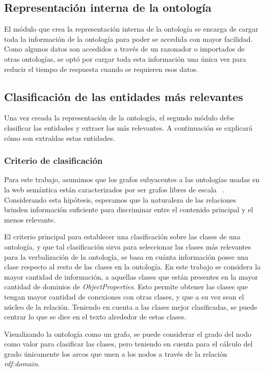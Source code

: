 \subsection{Representación interna de la ontología}

El módulo que crea la representación interna de la ontología se encarga de cargar toda la información de la ontología para poder se accedida con mayor facilidad. Como algunos datos son accedidos a través de un razonador o importados de otras ontologías, se optó por cargar toda esta información una única vez para reducir el tiempo de respuesta cuando se requieren esos datos.

\subsection{Clasificación de las entidades más relevantes}
Una vez creada la representación de la ontología, el segundo módulo debe clasificar las entidades y extraer las más relevantes. A continuación se explicará cómo son extraídas estas entidades.

\subsubsection{Criterio de clasificación}
Para este trabajo, asumimos que los grafos subyacentes a las ontologías usadas en la web semántica están caracterizados por ser grafos libres de escala ~\cite{zhang2008scale}. Considerando esta hipótesis, esperamos que la naturaleza de las relaciones brinden información suficiente para discriminar entre el contenido principal y el menos relevante.

El criterio principal para establecer una clasificación sobre las clases de una ontología, y que tal clasificación sirva para seleccionar las clases más relevantes para la verbalización de la ontología, se basa en cuánta información posee una clase respecto al resto de las clases en la ontología. En este trabajo se considera la mayor cantidad de información, a aquellas clases que están presentes en la mayor cantidad de dominios de \emph{ObjectProperties}. Esto permite obtener las clases que tengan mayor cantidad de conexiones con otras clases, y que a su vez sean el núcleo de la relación. Teniendo en cuenta a las clases mejor clasificadas, se puede centrar lo que se dice en el texto alrededor de estas clases.

Visualizando la ontología como un grafo, se puede considerar el grado del nodo como valor para clasificar las clases, pero teniendo en cuenta para el cálculo del grado únicamente los arcos que  
unen a los nodos a través de la relación \emph{rdf:domain}.

